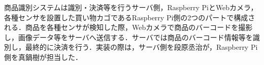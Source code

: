 商品識別システムは識別・決済等を行うサーバ側，Raspberry PiとWebカメラ，各種センサを設置した買い物カゴであるRaspberry Pi側の2つのパートで構成される．商品を各種センサが検知した際，Webカメラで商品のバーコードを撮影し，画像データ等をサーバへ送信する．サーバでは商品のバーコード情報等を識別し，最終的に決済を行う．実装の際は，サーバ側を段原丞治が，Raspberry Pi側を真鍋樹が担当した．